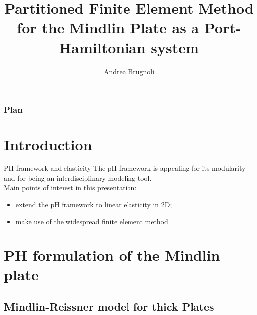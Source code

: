 \documentclass{beamer}
\title[CPDE Oaxaca 2019]{Partitioned Finite Element Method for the Mindlin Plate as a Port-Hamiltonian system}
\author[A. Brugnoli ISAE-SUPAERO]{\small Andrea Brugnoli}
\begin{document}
	
\nocite{*}

\begin{frame}
	\titlepage
\end{frame}

\begin{frame}
\frametitle{Plan}
\small
\tableofcontents
\normalsize
\end{frame}

\section{Introduction}

\begin{frame}{PH framework and elasticity}
The pH framework is appealing for its modularity and for being an interdisciplinary modeling tool. \\ 
Main points of interest in this presentation:
\begin{itemize}
\item extend the pH framework to linear elasticity in 2D;
\item make use of the widespread finite element method\, 
\end{itemize}

\end{frame}

\section{PH formulation of the Mindlin plate}
\subsection{Mindlin-Reissner model for thick Plates}
\end{document}
